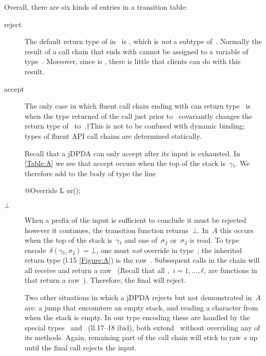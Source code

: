 \documentclass[a4paper,USenglish]{lipics-v2016}
\makeatletter
\newcommand\kk[1]{\textcolor{RoyalBlue}{\text{\textup{\textbf{\texttt{#1}}}}}}
\newcommand\cc[1]{\textcolor{Sepia}{\text{\textup{\textbf{\texttt{#1}}}}}}
\newcommand\gobble[1]{\@gobble{#1}}
\numberwithin{equation}{section}
\numberwithin{figure}{section}
\makeatother
\begin{document}
Overall, there are six kinds of entries in a transition table:
\begin{description}

  \item[\textsf{reject}]
  The default return type of \cc{\$()} in~\cc{C} is \cc{$ΣΣ$}, which
  is \emph{not} a subtype of~\cc{L}. Normally the result of a call chain that ends with \cc{\$()}
  cannot be assigned to a variable of type~\cc{L}. Moreover, since \cc{$ΣΣ$} is \kk{private},
  there is little that clients can do with this result.

  \item[\textsf{accept}]
  The only case in which fluent call chain ending with \cc{\$()} can return
    type~\cc{L} is when the type returned of the call just prior to~\cc{.\$()} covariantly
    changes the return type of~\cc{\$()} to~\cc{L}.†{This is not to be confused with dynamic binding;
    types of fluent API call chains are determined statically.}
  \par
  Recall that a jDPDA can only accept after its input is exhausted.
  In \cref{Table:A} we see that \textsf{accept} occurs when the top of the stack is~$γ₁$.
  We therefore add to the body of type \cc{C$γ$1} the line
  \begin{JAVA}
@Override L ¢\gobble$¢$();
  \end{JAVA}

  \item[$⊥$]
  When a prefix of the input is sufficient to conclude it must be rejected however it continues,
    the transition function returns~$⊥$.
  In~$A$ this occurs when the top of the stack is~$γ₁$ and one of~$σ_2$ or~$σ_3$ is read.
  To type encode~$δ(γ₁,σ₂) =⊥$, one must \emph{not} override \cc{$σ$2()} in type~\cc{C$γ$1};
    the inherited return type (l.15 \cref{Figure:A}) is the raw~\cc{C}.
  Subsequent calls in the chain will all receive and return a raw~\cc{C}
    (Recall that all \cc{$σ${}$i$()},~$i=1,…,ℓ$, are functions in~\cc{C} that return a raw~\cc{C}).
  Therefore, the final \cc{\$()} will reject.
  \par
  Two other situations in which a jDPDA rejects but not demonstrated in~$A$ are:
    a \textsf{jump} that encounters an empty stack, and reading a character from when the stack is empty.
  In our type encoding these are handled by the special
    types~\cc{E} and~\cc{¤} (ll.17--18 ibid), both extend~\cc{C} without
    overriding any of its methods. Again, remaining part of the call chain will stick to
    raw~\cc{C}s up until the final \cc{\$()} call rejects the input.


\end{description}
\end{document}
